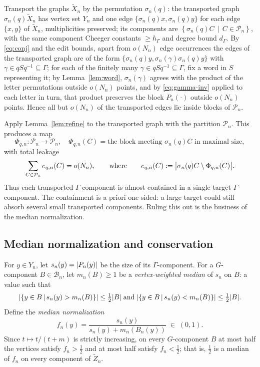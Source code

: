 \documentclass[11pt]{amsart}
\theoremstyle{definition}
\theoremstyle{plain}
\newcommand{\cP}{\mathcal P}
\newcommand{\cB}{\mathcal B}
\DeclarePairedDelimiter{\abs}{\lvert}{\rvert}
\newcommand{\set}[1]{\left\{#1\right\}}
\newcommand{\suchthat}{\,\middle|\,}
\begin{document}
Transport the graphs \(\widetilde X_n\) by the permutation \(\sigma_n(q)\): the transported graph \(\sigma_n(q)\widetilde X_n\) has vertex set \(Y_n\) and one edge \(\{\sigma_n(q)x,\sigma_n(q)y\}\) for each edge \(\{x,y\}\) of \(\widetilde X_n\), multiplicities preserved; its components are \(\set{\sigma_n(q)C\suchthat C\in\cP_n}\), with the same component Cheeger constants \(\geq h_\Gamma\) and degree bound \(d_\Gamma\).  By \eqref{eq:conj} and the edit bounds, apart from \(o(N_n)\) edge occurrences the edges of the transported graph are of the form \(\{\sigma_n(q)y,\sigma_n(\gamma)\sigma_n(q)y\}\) with \(\gamma\in qSq^{-1}\subseteq\Gamma\); for each of the finitely many \(\gamma\in qSq^{-1}\subseteq\Gamma\), fix a word in \(S\) representing it; by Lemma~\ref{lem:word}, \(\sigma_n(\gamma)\) agrees with the product of the letter permutations outside \(o(N_n)\) points, and by \eqref{eq:gamma-inv} applied to each letter in turn, that product preserves the block \(P_n(\cdot)\) outside \(o(N_n)\) points.  Hence all but \(o(N_n)\) of the transported edges lie inside blocks of \(\cP_n\).

Apply Lemma~\ref{lem:refine} to the transported graph with the partition \(\cP_n\).  This produces a map
\[
 \Phi_{q,n}:\cP_n\to\cP_n,
 \quad
 \Phi_{q,n}(C)=\text{the block meeting }\sigma_n(q)C\text{ in maximal size},
\]
with total leakage
\begin{equation}\label{eq:esum}
 \sum_{C\in\cP_n}e_{q,n}(C)=o(N_n),
 \qquad\text{where}\qquad
 e_{q,n}(C):=\abs[\big]{\sigma_n(q)C\setminus\Phi_{q,n}(C)}.
\end{equation}
Thus each transported \(\Gamma\)-component is almost contained in a single target \(\Gamma\)-component.  The containment is a priori one-sided: a large target could still absorb several small transported components.  Ruling this out is the business of the median normalization.

\subsection{Median normalization and conservation}\label{subsec:median}

For \(y\in Y_n\), let \(s_n(y)=\abs{P_n(y)}\) be the size of its \(\Gamma\)-component.  For a \(G\)-component \(B\in\cB_n\), let \(m_n(B)\geq1\) be a \emph{vertex-weighted median} of \(s_n\) on \(B\): a value such that
\[
 \abs{\set{y\in B\suchthat s_n(y)>m_n(B)}}\leq\tfrac12\abs B
 \;\text{and}\;
 \abs{\set{y\in B\suchthat s_n(y)<m_n(B)}}\leq\tfrac12\abs B.
\]
Define the \emph{median normalization}
\begin{equation}\label{eq:f}
 f_n(y)=\frac{s_n(y)}{s_n(y)+m_n(B_n(y))}
 \;\in\;(0,1).
\end{equation}
Since \(t\mapsto t/(t+m)\) is strictly increasing, on every \(G\)-component \(B\) at most half the vertices satisfy \(f_n>\frac12\) and at most half satisfy \(f_n<\frac12\); that is, \(\frac12\) is a median of \(f_n\) on every component of \(\widetilde Z_n\).
\end{document}
